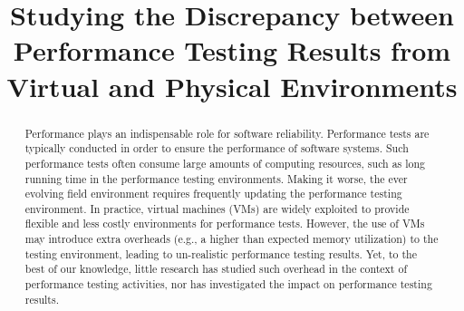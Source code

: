 \documentclass[10pt, conference]{IEEEtran}
\begin{document}
\title{Studying the Discrepancy between Performance Testing Results from Virtual and Physical Environments}

\author{

}

\maketitle
\thispagestyle{plain}
\pagestyle{plain}

\begin{abstract}
Performance plays an indispensable role for software reliability. 
Performance tests are typically conducted in order to ensure the performance of software systems. Such performance tests often consume large amounts of computing resources, such as long running time in the performance testing environments. Making it worse, the ever evolving field environment requires frequently updating the performance testing environment. In practice, virtual machines (VMs) are widely exploited to provide flexible and less costly environments for performance tests. However, the use of VMs may introduce extra overheads (e.g., a higher than expected memory utilization) to the testing environment, leading to un-realistic performance testing results. Yet, to the best of our knowledge, little research has studied such overhead in the context of performance testing activities, nor has investigated the impact on performance testing results. 
		

\end{abstract}
\end{document}
